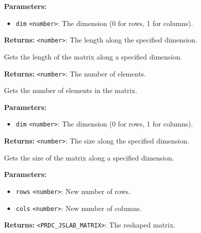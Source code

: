 \documentclass[12pt,a4paper]{article}
\begin{document}
\noindent \textbf{Parameters:}
\begin{itemize}
  \item \texttt{dim} \texttt{<number>}: The dimension (0 for rows, 1 for columns).
\end{itemize}

\noindent \textbf{Returns:} \texttt{<number>}: The length along the specified dimension.

\noindent Gets the length of the matrix along a specified dimension.

\vspace{5mm}
\noindent {}


\noindent \textbf{Returns:} \texttt{<number>}: The number of elements.

\noindent Gets the number of elements in the matrix.

\vspace{5mm}
\noindent {}


\noindent \textbf{Parameters:}
\begin{itemize}
  \item \texttt{dim} \texttt{<number>}: The dimension (0 for rows, 1 for columns).
\end{itemize}

\noindent \textbf{Returns:} \texttt{<number>}: The size along the specified dimension.

\noindent Gets the size of the matrix along a specified dimension.

\vspace{5mm}
\noindent {}


\noindent \textbf{Parameters:}
\begin{itemize}
  \item \texttt{rows} \texttt{<number>}: New number of rows.
  \item \texttt{cols} \texttt{<number>}: New number of columns.
\end{itemize}

\noindent \textbf{Returns:} \texttt{<PRDC\_JSLAB\_MATRIX>}: The reshaped matrix.
\end{document}
